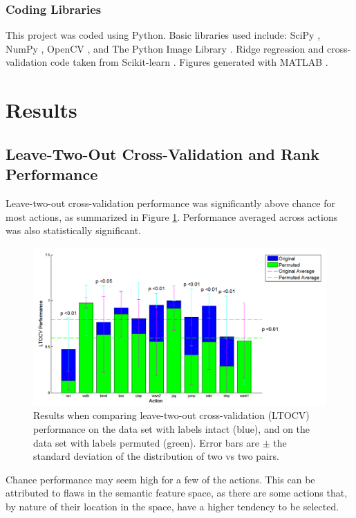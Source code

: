 \documentclass{article}
\begin{document}
\subsubsection{Coding Libraries}
This project was coded using Python. Basic libraries used include: SciPy \cite{scipy}, NumPy \cite{numpy}, OpenCV \cite{opencv}, and The Python Image Library \cite{pil}. Ridge regression and cross-validation code taken from Scikit-learn \cite{scikit}. Figures generated with MATLAB \cite{matlab}.

\section{Results}

\subsection{Leave-Two-Out Cross-Validation and Rank Performance}
Leave-two-out cross-validation performance was significantly above chance for most actions, as summarized in Figure \ref{ltocvplot}.  Performance averaged across actions was also statistically significant.

\begin{figure}[h]
  \centering
  \includegraphics[width=.85\linewidth]{ltocv_snap_new}
  \caption{Results when comparing leave-two-out cross-validation (LTOCV) performance on the data set with labels intact (blue), and on the data set with labels permuted (green). Error bars are $\pm$ the standard deviation of the distribution of two vs two pairs.}
  \label{ltocvplot}
\end{figure}

Chance performance may seem high for a few of the actions. This can be attributed to flaws in the semantic feature space, as there are some actions that, by nature of their location in the space, have a higher tendency to be selected.
\end{document}
